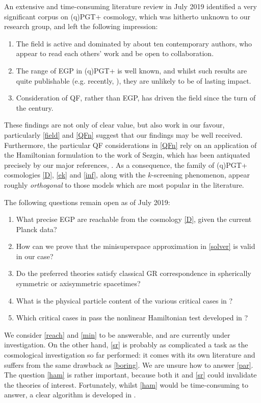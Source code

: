 \documentclass[twoside]{report}
\begin{document}
\begin{multicols}{2}
An extensive and time-consuming literature review in July 2019 identified a very significant corpus on (q)PGT+ cosmology, which was hitherto unknown to our research group, and left the following impression:
\begin{enumerate}[resume]
  \item\label{field} The field is active and dominated by about ten contemporary authors, who appear to read each others' work and be open to collaboration.
  \item\label{boring} The range of EGP in (q)PGT+ is well known, and whilst such results are quite publishable (e.g. recently, \cite{2019arXiv190604340Z}), they are unlikely to be of lasting impact.
  \item\label{QFn} Consideration of QF, rather than EGP, has driven the field since the turn of the century.
\end{enumerate}
These findings are not only of clear value, but also work in our favour, particularly \ref{field} and \ref{QFn} suggest that our findings may be well received. Furthermore, the particular QF considerations in \ref{QFn} rely \cite{2011PhRvD..83b4001B} on an application of the Hamiltonian formulation to the work of Sezgin, which has been antiquated precisely by our major references, \cite{2019PhRvD..99f4001L,Lin2}. As a consequence, the family of (q)PGT+ cosmologies \ref{D}, \ref{ek} and \ref{inf}, along with the $k$-screening phenomenon, appear roughly \textit{orthogonal} to those models which are most popular in the literature.

The following questions remain open as of July 2019:
\begin{enumerate}[resume]
  \item\label{reach} What precise EGP are reachable from the cosmology \ref{D}, given the current Planck data?
  \item\label{min} How can we prove that the minisuperspace approximation in \ref{solver} is valid in our case?
  \item\label{sr} Do the preferred theories satisfy classical GR correspondence in spherically symmetric or axisymmetric spacetimes?
  \item\label{par} What is the physical particle content of the various critical cases in \cite{2019PhRvD..99f4001L,Lin2}?
  \item\label{ham} Which critical cases in \cite{2019PhRvD..99f4001L,Lin2} pass the nonlinear Hamiltonian test developed in \cite{1999IJMPD...8..459Y,2002IJMPD..11..747Y}?
\end{enumerate}
We consider \ref{reach} and \ref{min} to be answerable, and are currently under investigation. On the other hand, \ref{sr} is probably as complicated a task as the cosmological investigation so far performed: it comes with its own literature and suffers from the same drawback as \ref{boring}. We are unsure how to answer \ref{par}. The question \ref{ham} is rather important, because both it and \ref{sr} could invalidate the theories of interest. Fortunately, whilst \ref{ham} would be time-consuming to answer, a clear algorithm is developed in \cite{1999IJMPD...8..459Y,2002IJMPD..11..747Y}.


\end{multicols}
\end{document}
